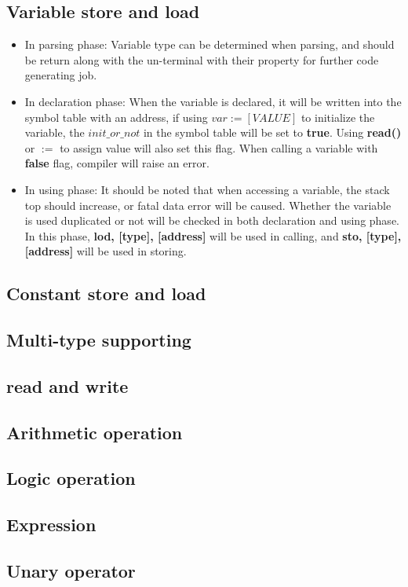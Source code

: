 \documentclass{article}
\begin{document}
		\subsection{Variable store and load}
		\begin{itemize}
		\item In parsing phase: Variable type can be determined when parsing, and should be return along with the un-terminal with their property for further code generating job.
		\item In declaration phase: When the variable is declared, it will be written into the symbol table with an address, if using $ var := [VALUE] $ to initialize the variable, the $ init\_or\_not $ in the symbol table will be set to \textbf{true}. Using \textbf{read()} or $ := $ to assign value will also set this flag. When calling a variable with \textbf{false} flag, compiler will raise an error. 
		\item In using phase: It should be noted that when accessing a variable, the stack top should increase, or fatal data error will be caused. Whether the variable is used duplicated or not will be checked in both declaration and using phase. In this phase, \textbf{lod, [type], [address]} will be used in calling, and \textbf{sto, [type], [address]} will be used in storing.
		\end{itemize}
		\subsection{Constant store and load}
		\subsection{Multi-type supporting}
		\subsection{read and write}
		\subsection{Arithmetic operation}
		\subsection{Logic operation}
		\subsection{Expression}
		\subsection{Unary operator}
\end{document}
